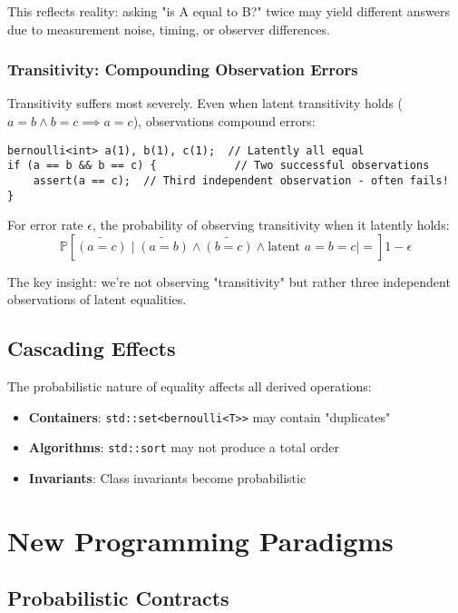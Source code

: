 \documentclass[11pt,final,hidelinks]{article}
\newcommand{\obs}[1]{\widetilde{#1}}  %
\newcommand{\ProbCond}[2]{\mathbb{P}\left[#1 \mid #2\right]}
\newcommand{\code}[1]{\texttt{#1}}
\begin{document}
This reflects reality: asking "is A equal to B?" twice may yield different answers due to measurement noise, timing, or observer differences.

\subsubsection{Transitivity: Compounding Observation Errors}

Transitivity suffers most severely. Even when latent transitivity holds ($a = b \land b = c \implies a = c$), observations compound errors:

\begin{verbatim}
bernoulli<int> a(1), b(1), c(1);  // Latently all equal
if (a == b && b == c) {            // Two successful observations
    assert(a == c);  // Third independent observation - often fails!
}
\end{verbatim}

For error rate $\epsilon$, the probability of observing transitivity when it latently holds:
\begin{equation}
\ProbCond{\obs{(a = c)} \mid \obs{(a = b)} \land \obs{(b = c)} \land \text{latent } a = b = c} = 1 - \epsilon
\end{equation}

The key insight: we're not observing "transitivity" but rather three independent observations of latent equalities.

\subsection{Cascading Effects}

The probabilistic nature of equality affects all derived operations:

\begin{itemize}
    \item \textbf{Containers}: \code{std::set<bernoulli<T>>} may contain "duplicates"
    \item \textbf{Algorithms}: \code{std::sort} may not produce a total order
    \item \textbf{Invariants}: Class invariants become probabilistic
\end{itemize}

\section{New Programming Paradigms}

\subsection{Probabilistic Contracts}
\end{document}
